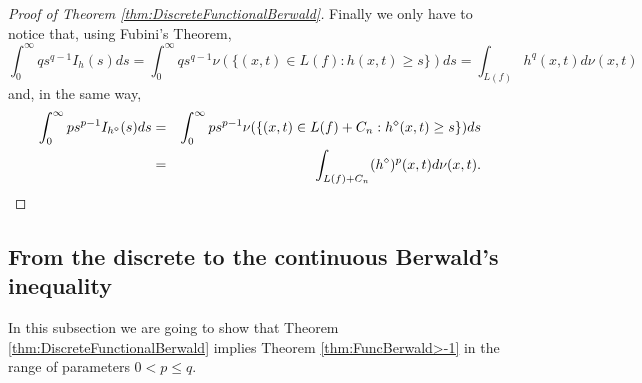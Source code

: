 \documentclass{amsart}
\theoremstyle{remark}
\theoremstyle{definition}
\numberwithin{equation}{section}
\begin{document}
\begin{proof}[Proof of  Theorem \ref{thm:DiscreteFunctionalBerwald}]
Finally we only have to notice that, using Fubini's Theorem,
$$
\int_0^{\infty}qs^{q-1}I_h(s) ds = \int_0^{\infty} q s^{q-1} \nu(\{ (x,t) \in L(f) : h(x,t) \geq s  \}) ds = \int_{L(f)} h^q(x,t) d\nu(x,t)
$$
and, in the same way,
\begin{eqnarray*}
\int_0^{\infty}ps^{p-1}I_{h^{\diamond}}(s) ds &=& \int_0^{\infty} p s^{p-1} \nu(\{ (x,t) \in L(f)+C_n : h^{\diamond}(x,t) \geq s  \}) ds \cr
&=& \int_{L(f)+C_n} (h^{\diamond})^p (x,t) d\nu(x,t).
\end{eqnarray*}
\end{proof}

\subsection{From the discrete to the continuous Berwald's inequality}

In this subsection we are going to show that Theorem \ref{thm:DiscreteFunctionalBerwald} implies Theorem \ref{thm:FuncBerwald>-1} in the range of parameters $0<p\leq q$.
\end{document}
